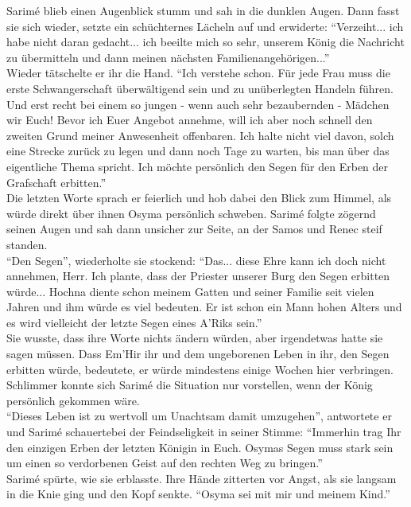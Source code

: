 Sarimé blieb einen Augenblick stumm und sah in die dunklen Augen. Dann fasst sie sich wieder, 
setzte ein schüchternes Lächeln auf und erwiderte: ``Verzeiht... ich habe nicht daran gedacht... 
ich beeilte mich so sehr, unserem König die Nachricht zu übermitteln und dann meinen nächsten 
Familienangehörigen...''\\
Wieder tätschelte er ihr die Hand. ``Ich verstehe schon. Für jede Frau muss die erste 
Schwangerschaft überwältigend sein und zu unüberlegten Handeln führen. Und erst recht bei einem so 
jungen - wenn auch sehr bezaubernden - Mädchen wir Euch! Bevor ich Euer Angebot annehme, will ich 
aber noch schnell den zweiten Grund meiner Anwesenheit offenbaren. Ich halte nicht viel davon, 
solch eine Strecke zurück zu legen und dann noch Tage zu warten, bis man über das eigentliche Thema 
spricht. Ich möchte persönlich den Segen für den Erben der Grafschaft erbitten.''\\
Die letzten Worte sprach er feierlich und hob dabei den Blick zum Himmel, als würde direkt über 
ihnen Osyma persönlich schweben. Sarimé folgte zögernd seinen Augen und sah dann unsicher zur 
Seite, an der Samos und Renec steif standen.\\
``Den Segen'', wiederholte sie stockend: ``Das... diese Ehre kann ich doch nicht annehmen, Herr. 
Ich plante, dass der Priester unserer Burg den Segen erbitten würde... Hochna diente schon meinem 
Gatten und seiner Familie seit vielen Jahren und ihm würde es viel bedeuten. Er ist schon ein Mann 
hohen Alters und es wird vielleicht der letzte Segen eines A'Riks sein.''\\
Sie wusste, dass ihre Worte nichts ändern würden, aber irgendetwas hatte sie sagen müssen. Dass 
Em'Hir ihr und dem ungeborenen Leben in ihr, den Segen erbitten würde, bedeutete, er würde 
mindestens einige Wochen hier verbringen. Schlimmer konnte sich Sarimé die Situation nur 
vorstellen, wenn der König persönlich gekommen wäre.\\
``Dieses Leben ist zu wertvoll um Unachtsam damit umzugehen'', antwortete er und Sarimé 
schauertebei der Feindseligkeit in seiner Stimme: ``Immerhin trag Ihr den einzigen Erben der 
letzten Königin in Euch. Osymas Segen muss stark sein um einen so verdorbenen Geist auf den rechten 
Weg zu bringen.''\\
Sarimé spürte, wie sie erblasste. Ihre Hände zitterten vor Angst, als sie langsam in die Knie ging 
und den Kopf senkte. ``Osyma sei mit mir und meinem Kind.''


